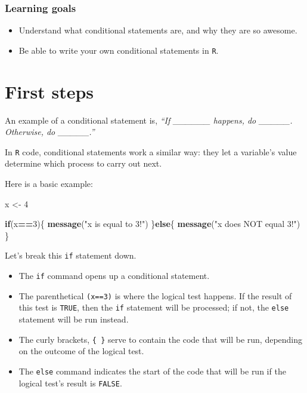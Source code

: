 \documentclass[
]{book}
\newenvironment{Shaded}{\begin{snugshade}}{\end{snugshade}}
\newcommand{\ControlFlowTok}[1]{\textcolor[rgb]{0.13,0.29,0.53}{\textbf{#1}}}
\newcommand{\DecValTok}[1]{\textcolor[rgb]{0.00,0.00,0.81}{#1}}
\newcommand{\KeywordTok}[1]{\textcolor[rgb]{0.13,0.29,0.53}{\textbf{#1}}}
\newcommand{\NormalTok}[1]{#1}
\newcommand{\OperatorTok}[1]{\textcolor[rgb]{0.81,0.36,0.00}{\textbf{#1}}}
\newcommand{\StringTok}[1]{\textcolor[rgb]{0.31,0.60,0.02}{#1}}
\providecommand{\tightlist}{%
  \setlength{\itemsep}{0pt}\setlength{\parskip}{0pt}}
\begin{document}
\hypertarget{learning-goals-17}{%
\subsubsection*{Learning goals}\label{learning-goals-17}}

\begin{itemize}
\tightlist
\item
  Understand what conditional statements are, and why they are so awesome.
\item
  Be able to write your own conditional statements in \texttt{R}.
\end{itemize}

\hypertarget{first-steps-1}{%
\section*{First steps}\label{first-steps-1}}

An example of a conditional statement is, \emph{``If \_\_\_\_\_\_ happens, do \_\_\_\_\_. Otherwise, do \_\_\_\_\_.''}

In \texttt{R} code, conditional statements work a similar way: they let a variable's value determine which process to carry out next.

Here is a basic example:

\begin{Shaded}
\begin{Highlighting}[]
\NormalTok{x <-}\StringTok{ }\DecValTok{4}

\ControlFlowTok{if}\NormalTok{(x}\OperatorTok{==}\DecValTok{3}\NormalTok{)\{}
  \KeywordTok{message}\NormalTok{(}\StringTok{"x is equal to 3!"}\NormalTok{)}
\NormalTok{\}}\ControlFlowTok{else}\NormalTok{\{}
  \KeywordTok{message}\NormalTok{(}\StringTok{"x does NOT equal 3!"}\NormalTok{)}
\NormalTok{\}}
\end{Highlighting}
\end{Shaded}

Let's break this \texttt{if} statement down.

\begin{itemize}
\tightlist
\item
  The \texttt{if} command opens up a conditional statement.
\item
  The parenthetical \texttt{(x==3)} is where the logical test happens. If the result of this test is \texttt{TRUE}, then the \texttt{if} statement will be processed; if not, the \texttt{else} statement will be run instead.
\item
  The curly brackets, \texttt{\{\ \}} serve to contain the code that will be run, depending on the outcome of the logical test.
\item
  The \texttt{else} command indicates the start of the code that will be run if the logical test's result is \texttt{FALSE}.
\end{itemize}
\end{document}
